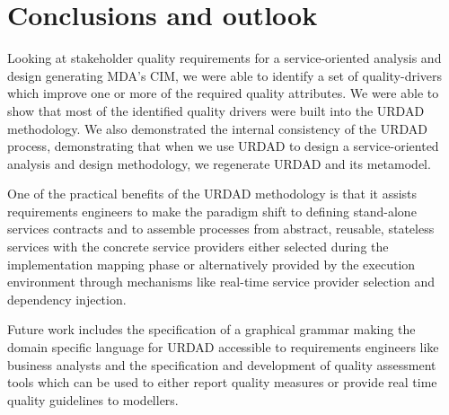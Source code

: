\section{Conclusions and outlook}

Looking at stakeholder quality requirements for a service-oriented analysis and design generating MDA's CIM, we were able to identify a set of quality-drivers which improve one or more of the required quality attributes. We were able to show that most of the identified quality drivers were built into the URDAD methodology. We also demonstrated the internal consistency of the URDAD process, demonstrating that when we use URDAD to design a service-oriented analysis and design methodology, we regenerate URDAD and its metamodel.

One of the practical benefits of the URDAD methodology is that it assists requirements engineers to make the paradigm shift\cite{haines_impact_2007} to defining stand-alone services contracts and to assemble processes from abstract, reusable, stateless services with the concrete service providers either selected during the implementation mapping phase or alternatively provided by the execution environment through mechanisms like real-time service provider selection and dependency injection.

Future work includes the specification of a graphical grammar making the domain specific language for URDAD accessible to requirements engineers like business analysts and the specification and development of quality assessment tools which can be used to either report quality measures or provide real time quality guidelines to modellers.